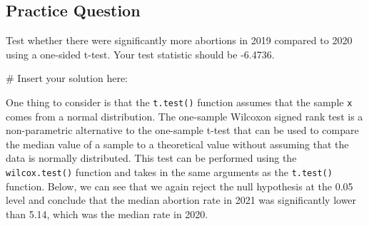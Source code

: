 \documentclass[
  letterpaper,
]{krantz}
\makeatletter
\newenvironment{Shaded}{\begin{snugshade}}{\end{snugshade}}
\newcommand{\AttributeTok}[1]{\textcolor[rgb]{0.40,0.45,0.13}{#1}}
\newcommand{\CommentTok}[1]{\textcolor[rgb]{0.37,0.37,0.37}{#1}}
\newcommand{\FloatTok}[1]{\textcolor[rgb]{0.68,0.00,0.00}{#1}}
\newcommand{\FunctionTok}[1]{\textcolor[rgb]{0.28,0.35,0.67}{#1}}
\newcommand{\NormalTok}[1]{\textcolor[rgb]{0.00,0.23,0.31}{#1}}
\newcommand{\OtherTok}[1]{\textcolor[rgb]{0.00,0.23,0.31}{#1}}
\newcommand{\SpecialCharTok}[1]{\textcolor[rgb]{0.37,0.37,0.37}{#1}}
\newcommand{\StringTok}[1]{\textcolor[rgb]{0.13,0.47,0.30}{#1}}
\newenvironment{kframe}{%
\medskip{}
\setlength{\fboxsep}{.8em}
 \def\at@end@of@kframe{}%
 \ifinner\ifhmode%
  \def\at@end@of@kframe{\end{minipage}}%
  \begin{minipage}{\columnwidth}%
 \fi\fi%
 \def\FrameCommand##1{\hskip\@totalleftmargin \hskip-\fboxsep
 \colorbox{shadecolor}{##1}\hskip-\fboxsep
     \hskip-\linewidth \hskip-\@totalleftmargin \hskip\columnwidth}%
 \MakeFramed {\advance\hsize-\width
   \@totalleftmargin\z@ \linewidth\hsize
   \@setminipage}}%
 {\par\unskip\endMakeFramed%
 \at@end@of@kframe}
\renewenvironment{Shaded}{\begin{kframe}}{\end{kframe}}
\makeatother
\begin{document}
\begin{Shaded}
\end{Shaded}

\hypertarget{practice-question-17}{%
\subsection{Practice Question}\label{practice-question-17}}

Test whether there were significantly more abortions in 2019 compared to
2020 using a one-sided t-test. Your test statistic should be -6.4736.

\begin{Shaded}
\begin{Highlighting}[]
\CommentTok{\# Insert your solution here:}
\end{Highlighting}
\end{Shaded}

One thing to consider is that the \texttt{t.test()} function assumes
that the sample \texttt{x} comes from a normal distribution. The
one-sample Wilcoxon signed rank test is a non-parametric alternative to
the one-sample t-test that can be used to compare the median value of a
sample to a theoretical value without assuming that the data is normally
distributed. This test can be performed using the \texttt{wilcox.test()}
function and takes in the same arguments as the \texttt{t.test()}
function. Below, we can see that we again reject the null hypothesis at
the 0.05 level and conclude that the median abortion rate in 2021 was
significantly lower than 5.14, which was the median rate in 2020.

\begin{Shaded}
\end{Shaded}
\end{document}
